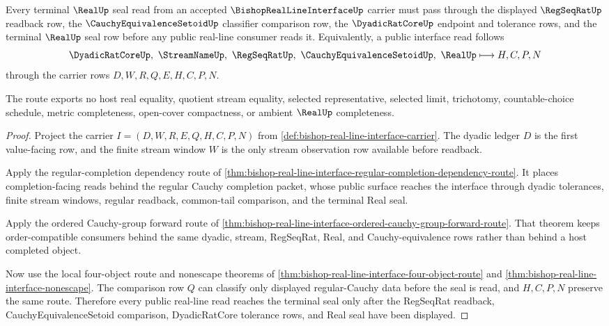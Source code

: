 \begin{theorem}
\label{thm:bishop-real-line-interface-regular-seal}
Every terminal $\RealUp$ seal read from an accepted $\BishopRealLineInterfaceUp$ carrier must pass through the displayed $\RegSeqRatUp$ readback row, the $\CauchyEquivalenceSetoidUp$ classifier comparison row, the $\DyadicRatCoreUp$ endpoint and tolerance rows, and the terminal $\RealUp$ seal row before any public real-line consumer reads it. Equivalently, a public interface read follows
$$
\DyadicRatCoreUp,\ \StreamNameUp,\ \RegSeqRatUp,\ \CauchyEquivalenceSetoidUp,\ \RealUp
\longmapsto H,C,P,N
$$
through the carrier rows $D,W,R,Q,E,H,C,P,N$.

The route exports no host real equality, quotient stream equality, selected representative, selected limit, trichotomy, countable-choice schedule, metric completeness, open-cover compactness, or ambient $\RealUp$ completeness.
\end{theorem}
\begin{proof}
Project the carrier $I=(D,W,R,E,Q,H,C,P,N)$ from \autoref{def:bishop-real-line-interface-carrier}. The dyadic ledger $D$ is the first value-facing row, and the finite stream window $W$ is the only stream observation row available before readback.

Apply the regular-completion dependency route of \autoref{thm:bishop-real-line-interface-regular-completion-dependency-route}. It places completion-facing reads behind the regular Cauchy completion packet, whose public surface reaches the interface through dyadic tolerances, finite stream windows, regular readback, common-tail comparison, and the terminal Real seal.

Apply the ordered Cauchy-group forward route of \autoref{thm:bishop-real-line-interface-ordered-cauchy-group-forward-route}. That theorem keeps order-compatible consumers behind the same dyadic, stream, RegSeqRat, Real, and Cauchy-equivalence rows rather than behind a host completed object.

Now use the local four-object route and nonescape theorems of \autoref{thm:bishop-real-line-interface-four-object-route} and \autoref{thm:bishop-real-line-interface-nonescape}. The comparison row $Q$ can classify only displayed regular-Cauchy data before the seal is read, and $H,C,P,N$ preserve the same route. Therefore every public real-line read reaches the terminal seal only after the RegSeqRat readback, CauchyEquivalenceSetoid comparison, DyadicRatCore tolerance rows, and Real seal have been displayed.
\end{proof}
